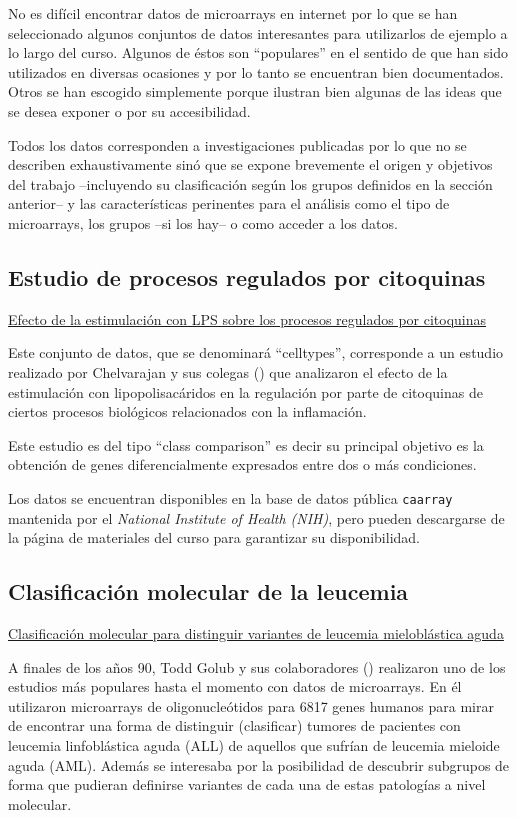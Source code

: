 No es dif\'icil encontrar datos de microarrays en internet por lo que
se han seleccionado algunos conjuntos de datos interesantes para
utilizarlos de ejemplo a lo largo del curso. Algunos de \'estos son
``populares'' en el sentido de que han sido utilizados en diversas
ocasiones y por lo tanto se encuentran bien documentados. Otros se han
escogido simplemente porque ilustran bien algunas de las ideas que se
desea exponer o por su accesibilidad.

Todos los datos corresponden a investigaciones publicadas por lo que no se describen exhaustivamente sin\'o que se expone brevemente el origen y objetivos del trabajo --incluyendo su clasificaci\'on seg\'un los grupos definidos en la secci\'on anterior-- y las caracter\'isticas perinentes para el an\'alisis como el tipo de microarrays, los grupos --si los hay-- o como acceder a los datos.

\subsection{Estudio de procesos regulados por citoquinas \label{celltypes}}
\underline{Efecto de la estimulaci\'on con LPS sobre los procesos regulados por citoquinas }

Este conjunto de datos, que se denominar\'a ``celltypes'', corresponde a un estudio realizado por Chelvarajan y sus colegas (\cite{Chelvarajan:2006}) que analizaron el efecto de la estimulaci\'on con lipopolisac\'aridos en la regulaci\'on por parte de citoquinas de ciertos procesos biol\'ogicos relacionados con la inflamaci\'on.

Este estudio es del tipo ``class comparison'' es decir su principal objetivo es la obtenci\'on de genes diferencialmente expresados entre dos o m\'as condiciones.

Los datos se encuentran disponibles en la base de datos p\'ublica \texttt{caarray} mantenida por el \emph{National Institute of Health (NIH)}, pero pueden descargarse de la p\'agina de materiales del curso para garantizar su disponibilidad.

\subsection{Clasificaci\'on molecular de la leucemia\label{golub}}

\underline{Clasificaci\'on molecular para distinguir variantes de leucemia mielobl\'astica aguda }

A finales de los a\~nos 90, Todd Golub y sus colaboradores (\cite{Golub:1999}) realizaron uno de los estudios m\'as populares hasta el momento con datos de microarrays. En \'el utilizaron microarrays de oligonucle\'otidos para 6817 genes humanos para mirar de encontrar una forma de distinguir (clasificar) tumores de pacientes con leucemia linfobl\'astica aguda (ALL) de aquellos que sufr\'ian de leucemia mieloide aguda (AML).
Adem\'as se interesaba por la posibilidad de descubrir subgrupos de forma que pudieran definirse variantes de cada una de estas patolog\'ias a nivel molecular.

